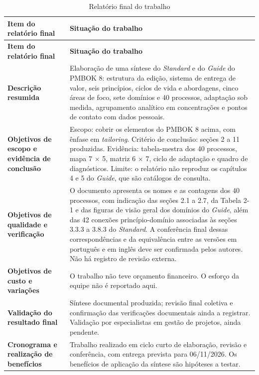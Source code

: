 \documentclass[12pt,a4paper,article,oneside,english,brazil]{abntex2}
\begin{document}
\begingroup\SingleSpacing\small
\begin{longtable}{@{}>{\raggedright\arraybackslash}p{}>{\raggedright\arraybackslash}p{}@{}}
\caption{Relatório final do trabalho}\label{tab:t14}\\
\hline
\textbf{Item do relatório final} & \textbf{Situação do trabalho}\\
\hline
\endfirsthead
\hline
\textbf{Item do relatório final} & \textbf{Situação do trabalho}\\
\hline
\endhead
\hline
\endfoot
\hline
\endlastfoot
\textbf{Descrição resumida} & Elaboração de uma síntese do \textit{Standard} e do \textit{Guide} do PMBOK 8: estrutura da edição, sistema de entrega de valor, seis princípios, ciclos de vida e abordagens, cinco áreas de foco, sete domínios e 40 processos, adaptação sob medida, agrupamento analítico em concentrações e pontos de contato com dados pessoais.\\[3pt]
\textbf{Objetivos de escopo e evidência de conclusão} & Escopo: cobrir os elementos do PMBOK 8 acima, com ênfase em \textit{tailoring}. Critério de conclusão: seções 2 a 11 produzidas. Evidência: tabela-mestra dos 40 processos, mapa 7 \ensuremath{\times} 5, matriz 6 \ensuremath{\times} 7, ciclo de adaptação e quadro de diagnósticos. Limite: o relatório não reproduz os capítulos 4 e 5 do \textit{Guide}, que são catálogos de consulta.\\[3pt]
\textbf{Objetivos de qualidade e verificação} & O documento apresenta os nomes e as contagens dos 40 processos, com indicação das seções 2.1 a 2.7, da Tabela 2-1 e das figuras de visão geral dos domínios do \textit{Guide}, além das 42 conexões princípio-domínio associadas às seções 3.3.3 a 3.8.3 do \textit{Standard}. A conferência final dessas correspondências e da equivalência entre as versões em português e em inglês deve ser confirmada pelos autores. Não há registro de revisão externa.\\[3pt]
\textbf{Objetivos de custo e variações} & O trabalho não teve orçamento financeiro. O esforço da equipe não é reportado aqui.\\[3pt]
\textbf{Validação do resultado final} & Síntese documental produzida; revisão final coletiva e confirmação das verificações documentais ainda a registrar. Validação por especialistas em gestão de projetos, ainda pendente.\\[3pt]
\textbf{Cronograma e realização de benefícios} & Trabalho realizado em ciclo curto de elaboração, revisão e conferência, com entrega prevista para 06/11/2026. Os benefícios de aplicação da síntese são hipóteses a testar.\\[3pt]

\end{longtable}
\end{document}
